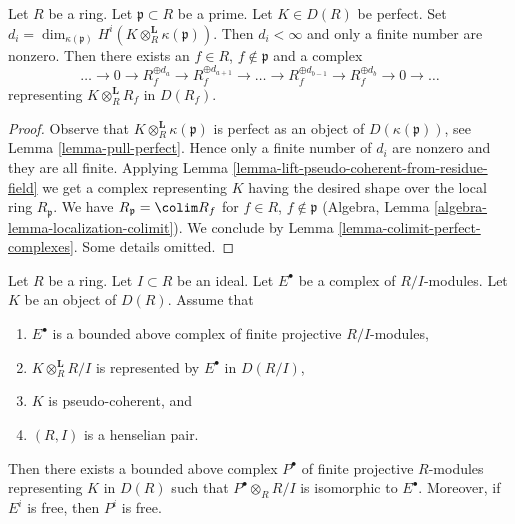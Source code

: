 \begin{lemma}
\label{lemma-lift-perfect-from-residue-field}
Let $R$ be a ring. Let $\mathfrak p \subset R$ be a prime. Let $K \in D(R)$
be perfect. Set
$d_i =
\dim_{\kappa(\mathfrak p)} H^i(K \otimes_R^\mathbf{L} \kappa(\mathfrak p))$.
Then $d_i < \infty$ and only a finite number are nonzero.
Then there exists an $f \in R$, $f \not \in \mathfrak p$ and a
complex
$$
\ldots \to 0 \to R_f^{\oplus d_a} \to R_f^{\oplus d_{a + 1}} \to
\ldots \to
R_f^{\oplus d_{b - 1}} \to
R_f^{\oplus d_b} \to 0
\to \ldots
$$
representing $K \otimes_R^\mathbf{L} R_f$ in $D(R_f)$.
\end{lemma}

\begin{proof}
Observe that $K \otimes_R^\mathbf{L} \kappa(\mathfrak p)$
is perfect as an object of $D(\kappa(\mathfrak p))$, see
Lemma \ref{lemma-pull-perfect}. Hence only a finite number of
$d_i$ are nonzero and they are all finite. Applying
Lemma \ref{lemma-lift-pseudo-coherent-from-residue-field}
we get a complex representing $K$
having the desired shape over the local ring $R_\mathfrak p$.
We have $R_\mathfrak p = \colim R_f$ for
$f \in R$, $f \not \in \mathfrak p$
(Algebra, Lemma \ref{algebra-lemma-localization-colimit}).
We conclude by Lemma \ref{lemma-colimit-perfect-complexes}.
Some details omitted.
\end{proof}

\begin{lemma}
\label{lemma-lift-complex-finite-projectives}
Let $R$ be a ring. Let $I \subset R$ be an ideal. Let $E^\bullet$
be a complex of $R/I$-modules. Let $K$ be an object of $D(R)$. Assume that
\begin{enumerate}
\item $E^\bullet$ is a bounded above complex of finite projective $R/I$-modules,
\item $K \otimes_R^\mathbf{L} R/I$ is represented by $E^\bullet$ in $D(R/I)$,
\item $K$ is pseudo-coherent, and
\item $(R, I)$ is a henselian pair.
\end{enumerate}
Then there exists a bounded above complex $P^\bullet$ of finite projective
$R$-modules representing $K$ in $D(R)$ such that $P^\bullet \otimes_R R/I$
is isomorphic to $E^\bullet$. Moreover, if $E^i$ is free, then $P^i$ is free.
\end{lemma}

